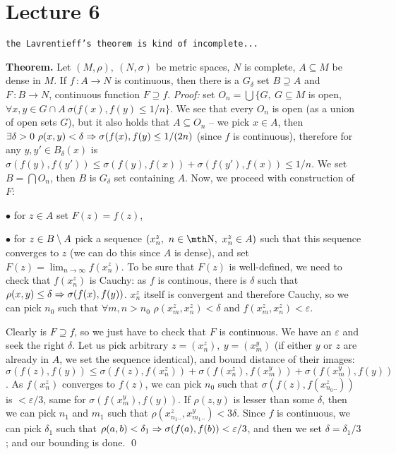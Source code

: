\chapter{Lecture 6}
\centerline{\tt the Lavrentieff's theorem is kind of incomplete...}


{\bf Theorem. } Let $(M,\rho),\ (N,\sigma)$ be metric spaces, $N$ is complete,
$A\subseteq M$ be dense in $M$. If $f\,:A\to N$ is continuous, then there is a 
$G_\delta$ set $B\supseteq A$ and $F\,:B\to N$, continuous function $F\supseteq 
f$.
\smallskip
{\it Proof:} set $O_n = \bigcup \{G,\ G\subseteq M$ is open, $\forall x,y\in 
G\cap A\ \sigma(f(x),f(y)\leq 1/n\}$. We see that every $O_n$ is open (as a 
union of open sets $G$), but it also holds that $A\subseteq O_n$ -- we pick 
$x\in A$, then $\exists \delta > 0\ \rho(x,y) < \delta \Rightarrow \sigma (f(x),
f(y) \leq 1/(2n)$ (since $f$ is continuous), therefore for any $y,y' \in 
B_{\delta}(x)$ is $\sigma(f(y),f(y')) \leq \sigma(f(y),f(x)) + \sigma(f(y')
,f(x)) \leq 1/n$. We set $B=\bigcap O_n$, then $B$ is $G_\delta$ set containing 
$A$. Now, we proceed with construction of $F$:
{\parindent0.5in\parskip6pt
	\item{$\bullet$} for $z\in A$ set $F(z) = f(z)$,
	\item{$\bullet$} for $z\in B\setminus A$ pick a sequence $(x_n^z,\ n\in \N,\ 
		x_n^z\in A)$ such that this sequence converges to $z$ (we can do this 
		since $A$ is dense), and set $F(z) = \lim_{n\to \infty} f(x_n^z)$. To 
		be sure that $F(z)$ is well-defined, we need to check that $f(x_n^z)$
		is Cauchy: as $f$ is continous, there is $\delta$ such that $\rho(x,
		y)\leq \delta\Rightarrow \sigma(f(x),f(y))$. $x_n^z$ itself is convergent 
		and therefore Cauchy, so we can pick $n_0$ such that $\forall m,n>n_0$
		$\rho(x_m^z,x_n^z) < \delta$ and $f(x_m^z,x_n^z) < \varepsilon$.

}
Clearly is $F\supseteq f$, so we just have to check that $F$ is continuous.
We have an $\varepsilon$ and seek the right $\delta$. Let us pick arbitrary 
$z = (x_n^z),\ y=(x_m^y)$ (if either $y$ or $z$ are already in $A$, we set the 
sequence identical), and bound distance of their images: $\sigma(f(z),f(y)) 
\leq \sigma(f(z),f(x_n^z)) +\sigma(f(x_n^z),f(x_m^y)) +\sigma(f(x_m^y),f(y))$.
As $f(x_n^z)$ converges to $f(z)$, we can pick $n_0$ such that $\sigma(f(z),
f(x_{n_0..}^z))$ is $<\varepsilon/3$, same for $\sigma(f(x_m^y),f(y))$. If 
$\rho(z,y)$ is lesser than some $\delta$, then we can pick $n_1$ and $m_1$ 
such that $\rho(x_{n_1..}^z,x_{m_1..}^y) < 3\delta$. Since $f$ is continuous, 
we can pick $\delta_1$ such that $\rho(a,b) < \delta_1 \Rightarrow \sigma(f(a),f(b))
< \varepsilon/3$, and then we set $\delta = \delta_1/3$; and our bounding is 
done.
\qed

